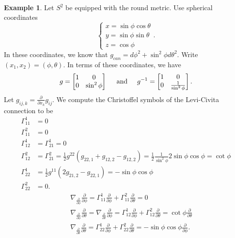 \documentclass{amsart}
\numberwithin{equation}{section}
\theoremstyle{definition}
\newtheorem{example}[definition]{Example}
\theoremstyle{theorem}
\begin{document}
\begin{example}\label{two-sphere-nabla}
Let $S^2$ be equipped with the round metric. 
Use spherical coordinates 
\[
\begin{cases}
x = \sin \phi \cos \theta \\
y = \sin \phi \sin \theta \\
z = \cos \phi
\end{cases}.
\]
In these coordinates, we know that $g_{can} = d\phi^2 + \sin^2 \phi d \theta^2$. Write $(x_1,x_2) = (\phi, \theta)$. In terms of these coordinates, we have 
\[
g = \begin{bmatrix}
1 & 0 \\ 0 & \sin^2 \phi
\end{bmatrix}
\hspace{5mm} \text{and} \hspace{5mm}
g^{-1} = \begin{bmatrix}
1 & 0 \\ 0 & \frac{1}{\sin^2\phi}
\end{bmatrix}.
\]
Let $g_{ij,k}=\frac{\partial }{\partial x_k}g_{ij}$. We
compute the Christoffel symbols of the Levi-Civita connection to be 
\begin{align*}
\Gamma_{11}^1 &= 0 \\
\Gamma_{11}^2 &= 0 \\
\Gamma_{12}^1 &= \Gamma_{21}^1 = 0 \\
\Gamma_{12}^2 &= \Gamma_{21}^2 = \frac{1}{2} g^{22}(g_{22,1} + g_{12,2} - g_{12,2}) = \frac{1}{2} \frac{1}{\sin^2\phi} 2 \sin\phi \cos \phi = \cot \phi \\
\Gamma_{22}^1 &= \frac{1}{2} g^{11}(2g_{21,2}-g_{22,1})= - \sin\phi \cos\phi \\
\Gamma_{22}^2 &= 0.
\end{align*}
\begin{eqnarray*}
&& \nabla_{\frac{\partial}{\partial \phi}} \frac{\partial}{\partial \phi}
=\Gamma_{11}^1 \frac{\partial}{\partial \phi}+\Gamma_{11}^2\frac{\partial}{\partial \theta}=0 \\
&& \nabla_{\frac{\partial}{\partial \phi}} \frac{\partial}{\partial \theta}
=\nabla_{\frac{\partial}{\partial \theta}} \frac{\partial}{\partial \phi}
=\Gamma_{12}^1 \frac{\partial}{\partial \phi}+\Gamma_{12}^2\frac{\partial}{\partial \theta}
=\cot \phi \frac{\partial}{\partial \theta}\\
&&\nabla_{\frac{\partial}{\partial \theta}} \frac{\partial}{\partial \theta}
=\Gamma_{22}^1 \frac{\partial}{\partial \phi}+\Gamma_{22}^2\frac{\partial}{\partial \theta}=
-\sin\phi\cos\phi \frac{\partial}{\partial \phi}.
\end{eqnarray*}



\end{example}
\end{document}
